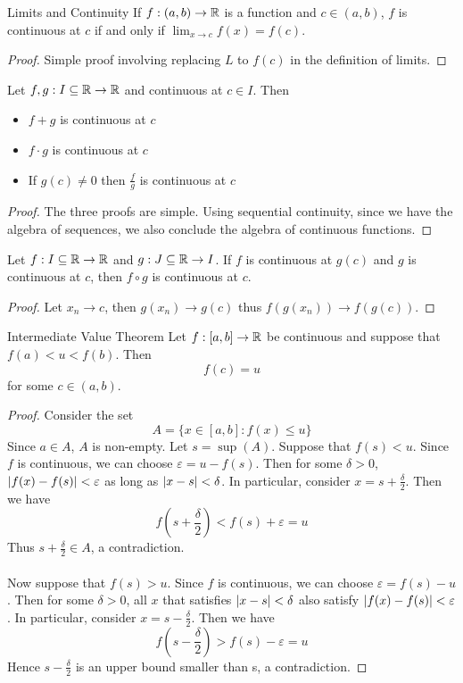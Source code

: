 \documentclass[a4paper]{article}
\begin{document}
\begin{thm}{Limits and Continuity}{} If $f:(a,b)\to\mathbb{R}$ is a function and $c\in(a,b)$, $f$ is continuous at $c$ if and only if $\lim_{x\to c}f(x)=f(c)$. \tcbline
\begin{proof} Simple proof involving replacing $L$ to $f(c)$ in the definition of limits. 
\end{proof}
\end{thm}

\begin{prp}{}{} Let $f,g:I\subseteq\mathbb{R}\to\mathbb{R}$ and continuous at $c\in I$. Then
\begin{itemize}
\item $f+g$ is continuous at $c$
\item $f\cdot g$ is continuous at $c$
\item If $g(c)\neq0$ then $\frac{f}{g}$ is continuous at $c$
\end{itemize}\tcbline
\begin{proof} The three proofs are simple. Using sequential continuity, since we have the algebra of sequences, we also conclude the algebra of continuous functions. 
\end{proof}
\end{prp}

\begin{prp}{}{} Let $f:I\subseteq\mathbb{R}\to\mathbb{R}$ and $g:J\subseteq\mathbb{R}\to I$. If $f$ is continuous at $g(c)$ and $g$ is continuous at $c$, then $f\circ g$ is continuous at $c$. \tcbline
\begin{proof} Let $x_n\to c$, then $g(x_n)\to g(c)$ thus $f(g(x_n))\to f(g(c))$. 
\end{proof}
\end{prp}

\begin{thm}{Intermediate Value Theorem}{} Let $f:[a,b]\to\mathbb{R}$ be continuous and suppose that $f(a)<u<f(b)$. Then $$f(c)=u$$ for some $c\in(a,b)$.\tcbline
\begin{proof} Consider the set $$A=\{x\in[a,b]:f(x)\leq u\}$$ Since $a\in A$, $A$ is non-empty. Let $s=\sup(A)$. Suppose that $f(s)<u$. Since $f$ is continuous, we can choose $\varepsilon=u-f(s)$. Then for some $\delta>0$, $\abs{f(x)-f(s)}<\varepsilon$ as long as $\abs{x-s}<\delta$. In particular, consider $x=s+\frac{\delta}{2}$. Then we have $$f\left(s+\frac{\delta}{2}\right)<f(s)+\varepsilon=u$$ Thus $s+\frac{\delta}{2}\in A$, a contradiction. \\~\\
Now suppose that $f(s)>u$. Since $f$ is continuous, we can choose $\varepsilon=f(s)-u$. Then for some $\delta>0$, all $x$ that satisfies $\abs{x-s}<\delta$ also satisfy $\abs{f(x)-f(s)}<\varepsilon$. In particular, consider $x=s-\frac{\delta}{2}$. Then we have $$f\left(s-\frac{\delta}{2}\right)>f(s)-\varepsilon=u$$ Hence $s-\frac{\delta}{2}$ is an upper bound smaller than s, a contradiction. 
\end{proof}
\end{thm}
\end{document}
